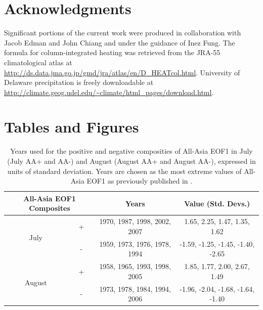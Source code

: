 	
\section{Acknowledgments}

	Significant portions of the current work were produced in collaboration with Jacob Edman and John Chiang and under the guidance of Inez Fung. The formula for column-integrated heating was retrieved from the JRA-55 climatological atlas at \url{http://ds.data.jma.go.jp/gmd/jra/atlas/en/D_HEATcol.html}. University of Delaware precipitation is freely downloadable at \url{http://climate.geog.udel.edu/~climate/html_pages/download.html}.


\newpage	
\section{Tables and Figures}


\begin{table}[p]

\caption{Years used for the positive and negative composities of All-Asia EOF1 in July (July AA+ and AA-) and August (August AA+ and August AA-), expressed in units of standard deviation. Years are chosen as the most extreme values of All-Asia EOF1 as previously published in \citet{Day2015}.}
\centering

\begin{tabular}{ c c c c}
	 	 		\multicolumn{2}{c}{All-Asia EOF1 Composites} 	&			Years				&		Value (Std. Devs.)			\tabularnewline	
				\hline
	 \multirow{2}{*}{July} 		&  +							&	1970, 1987, 1998, 2002, 2007 	&	1.65, 2.25, 1.47, 1.35, 1.62		\tabularnewline
	 						&  -							&	1959, 1973, 1976, 1978, 1994       &	-1.59, -1.25, -1.45, -1.40, -2.65	\tabularnewline
	 \multirow{2}{*}{August}	&  + 							&	1958, 1965, 1993, 1998, 2005	&	1.85, 1.77, 2.00, 2.67, 1.49		\tabularnewline
	 						&  -  							&	1973, 1978, 1984, 1994, 2006	&	-1.96, -2.04, -1.68, -1.64, -1.40 	\tabularnewline

\end{tabular}
\label{tab:t41}
\end{table}

